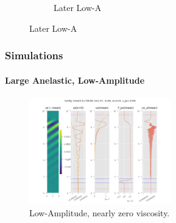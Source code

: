 \documentclass[dvipsnames, 10pt]{beamer}
\begin{document}
\begin{frame}
\begin{figure}[t]
\begin{subfigure}{0.55\textwidth}
            \caption{Later Low-A}
        \end{subfigure}
        \hspace*{-19mm}%
    \end{figure}
\end{frame}

\begin{frame}
    \frametitle{Simulations}
    \framesubtitle{Large Anelastic, Low-Amplitude}

    \begin{figure}[t]
        \centering
        \includegraphics[width=0.55\textwidth]{lin_nonu.png}
        \caption{Low-Amplitude, nearly zero viscosity.}
    \end{figure}
\end{frame}
\end{document}
